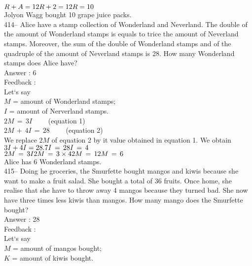 ﻿\documentclass[letterpaper, 12pt]{article}
\begin{document}
$R+A=12\\
R+2=12\\
R=10$\\
Jolyon Wagg bought 10 grape juice packs.\\

414-- Alice have a stamp collection of Wonderland and Neverland. The double of the amount of Wonderland stamps is equals to trice the amount of Neverland stamps. Moreover, the sum of the double of Wonderland stamps and of the quadruple of the amount of Neverland stamps is 28. How many Wonderland stamps does Alice have?\\

Answer : 6\\

Feedback : \\
Let`s say\\
$M$ = amount of Wonderland stamps;\\
$I$ = amount of Nerverland stamps.\\

$2M\,=\,3I \qquad $ (equation 1)\\
$2M\,+\,4I\,=\,28 \qquad $ (equation 2)\\
We replace $2M$ of equation 2 by it value obtained in equation 1. We obtain $3I+4I=28.\\
7I\,=\,28\\
I\,=\,4$\\

$2M\,=\,3I\\
2M\,=\,3\times4\\
2M\,=\,12\\
M\,=\,6$\\
Alice has 6 Wonderland stamps.\\

415-- Doing he groceries, the Smurfette bought mangos and kiwis because she want to make a fruit salad. She bought a total of 36 fruits. Once home, she realise that she have to throw away 4 mangos because they turned bad. She now have three times less kiwis than mangos. How many mango does the Smurfette bought?\\


Answer : 28\\

Feedback : \\
Let`s say\\
$M$ = amount of mangos bought;\\
$K$ = amount of kiwis bought.\\
\end{document}
